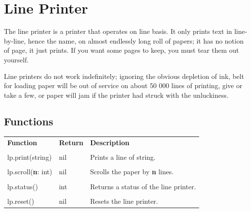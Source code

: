 \documentclass[10pt, stock]{memoir}
\let\oldsection\section
\renewcommand\section{\clearpage\oldsection}
\begin{document}
\section{Line Printer}

The line printer is a printer that operates on line basis. It only prints text in line-by-line, hence the name, on almost endlessly long roll of papers; it has no notion of page, it just prints. If you want some pages to keep, you must tear them out yourself.

Line printers do not work indefinitely; ignoring the obvious depletion of ink, belt for loading paper will be out of service on about 50 000 lines of printing, give or take a few, or paper will jam if the printer had struck with the unluckiness.

\subsection{Functions}

\begin{tabularx}{\textwidth}{l l X}
	\textbf{\large Function} & \textbf{\large Return} & \textbf{\large Description}
	\\ \\
	\endhead
	lp.print(string) & nil & Prints a line of string.
	\\ \\
	lp.scroll(\textbf{n}: int) & nil & Scrolls the paper by \textbf{n} lines.
	\\ \\
	lp.status() & int & Returns a status of the line printer.
	\\ \\
	lp.reset() & nil & Resets the line printer.
\end{tabularx}

\afterpage{\pagestyle{empty}\null\newpage}
\end{document}
